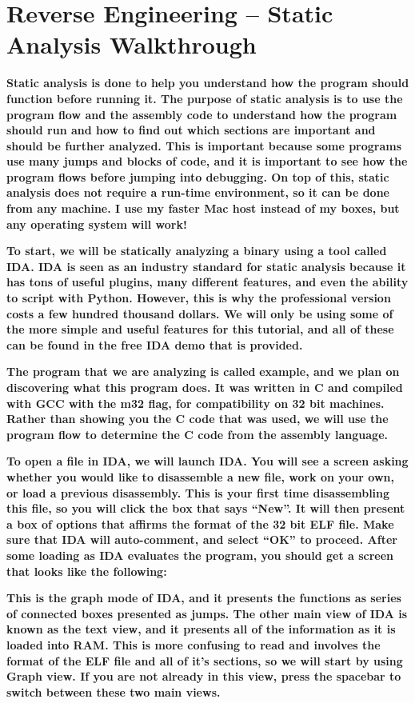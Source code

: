 \section{Reverse Engineering -- Static Analysis Walkthrough}

\textbf{Static analysis is done to help you understand how the program should function before running it. The purpose of
static analysis is to use the program flow and the assembly code to understand how the program should run and how to
find out which sections are important and should be further analyzed. This is important because some programs use many
jumps and blocks of code, and it is important to see how the program flows before jumping into debugging. On top of
this, static analysis does not require a run-time environment, so it can be done from any machine. I use my faster Mac
host instead of my boxes, but any operating system will work!}

\textbf{To start, we will be statically analyzing a binary using a tool called IDA. IDA is seen as an industry standard
for static analysis because it has tons of useful plugins, many different features, and even the ability to script with
Python. However, this is why the professional version costs a few hundred thousand dollars. We will only be using some
of the more simple and useful features for this tutorial, and all of these can be found in the free IDA demo that is
provided.}

\textbf{The program that we are analyzing is called
}\textbf{\textcolor[rgb]{0.21960784,0.4627451,0.11372549}{example}}\textbf{, and we plan on discovering what this
program does. It was written in C and compiled with GCC with the m32 flag, for compatibility on 32 bit machines. Rather
than showing you the C code that was used, we will use the program flow to determine the C code from the assembly
language.}

\textbf{To open a file in IDA, we will launch IDA. You will see a screen asking whether you would like to disassemble a
new file, work on your own, or load a previous disassembly. This is your first time disassembling this file, so you
will click the box that says ``New''. It will then present a box of options that affirms the format of the 32 bit ELF
file. Make sure that IDA will auto-comment, and select ``OK'' to proceed. After some loading as IDA evaluates the
program, you should get a screen that looks like the following:}

  
 \textbf{This is the graph mode of IDA, and it presents the functions as series of connected boxes presented as jumps.
The other main view of IDA is known as the text view, and it presents all of the information as it is loaded into RAM.
This is more confusing to read and involves the format of the ELF file and all of it's sections, so we will start by
using Graph view. If you are not already in this view, press the spacebar to switch between these two main views.}

